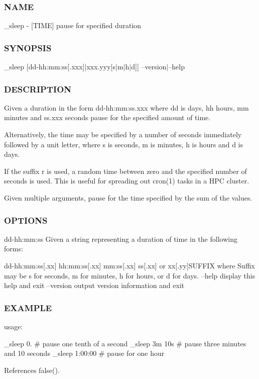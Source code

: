 \subsubsection*{N\+A\+ME}

\+\_\+sleep -\/ \mbox{[}T\+I\+ME\mbox{]} pause for specified duration \subsubsection*{S\+Y\+N\+O\+P\+S\+IS}

\+\_\+sleep \mbox{[}dd-\/hh\+:mm\+:ss\mbox{[}.xxx\mbox{]}$\vert$xxx.yyy\mbox{[}s$\vert$m$\vert$h$\vert$d\mbox{]}\mbox{]} --version$\vert$--help \subsubsection*{D\+E\+S\+C\+R\+I\+P\+T\+I\+ON}

Given a duration in the form dd-\/hh\+:mm\+:ss.\+xxx where dd is days, hh hours, mm minutes and ss.\+xxx seconds pause for the specified amount of time.

Alternatively, the time may be specified by a number of seconds immediately followed by a unit letter, where s is seconds, m is minutes, h is hours and d is days.

If the suffix r is used, a random time between zero and the specified number of seconds is used. This is useful for spreading out cron(1) tasks in a H\+PC cluster.

Given multiple arguments, pause for the time specified by the sum of the values. \subsubsection*{O\+P\+T\+I\+O\+NS}

dd-\/hh\+:mm\+:ss Given a string representing a duration of time in the following forms\+:

dd-\/hh\+:mm\+:ss\mbox{[}.xx\mbox{]} hh\+:mm\+:ss\mbox{[}.xx\mbox{]} mm\+:ss\mbox{[}.xx\mbox{]} ss\mbox{[}.xx\mbox{]} or xx\mbox{[}.yy\mbox{]}S\+U\+F\+F\+IX where Suffix may be s for seconds, m for minutes, h for hours, or d for days. --help display this help and exit --version output version information and exit \subsubsection*{E\+X\+A\+M\+P\+LE}

usage\+:

\+\_\+sleep 0. \# pause one tenth of a second \+\_\+sleep 3m 10s \# pause three minutes and 10 seconds \+\_\+sleep 1\+:00\+:00 \# pause for one hour 

References false().

